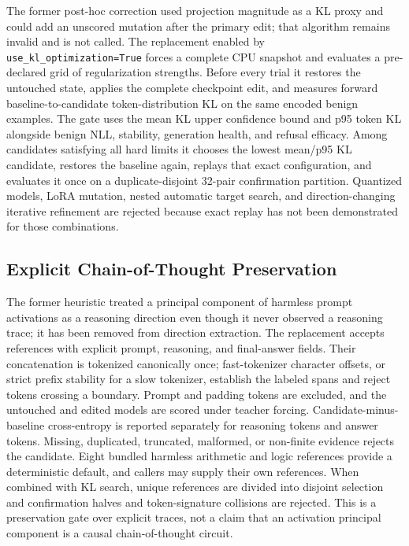 \documentclass[11pt]{article}
\begin{document}
The former post-hoc correction used projection magnitude as a KL proxy and could add an unscored mutation after the primary edit; that algorithm remains invalid and is not called. The replacement enabled by \texttt{use\_kl\_optimization=True} forces a complete CPU snapshot and evaluates a pre-declared grid of regularization strengths. Before every trial it restores the untouched state, applies the complete checkpoint edit, and measures forward baseline-to-candidate token-distribution KL on the same encoded benign examples. The gate uses the mean KL upper confidence bound and p95 token KL alongside benign NLL, stability, generation health, and refusal efficacy. Among candidates satisfying all hard limits it chooses the lowest mean/p95 KL candidate, restores the baseline again, replays that exact configuration, and evaluates it once on a duplicate-disjoint 32-pair confirmation partition. Quantized models, LoRA mutation, nested automatic target search, and direction-changing iterative refinement are rejected because exact replay has not been demonstrated for those combinations.

\subsection{Explicit Chain-of-Thought Preservation}
\label{sec:cot}

The former heuristic treated a principal component of harmless prompt activations as a reasoning direction even though it never observed a reasoning trace; it has been removed from direction extraction. The replacement accepts references with explicit prompt, reasoning, and final-answer fields. Their concatenation is tokenized canonically once; fast-tokenizer character offsets, or strict prefix stability for a slow tokenizer, establish the labeled spans and reject tokens crossing a boundary. Prompt and padding tokens are excluded, and the untouched and edited models are scored under teacher forcing. Candidate-minus-baseline cross-entropy is reported separately for reasoning tokens and answer tokens. Missing, duplicated, truncated, malformed, or non-finite evidence rejects the candidate. Eight bundled harmless arithmetic and logic references provide a deterministic default, and callers may supply their own references. When combined with KL search, unique references are divided into disjoint selection and confirmation halves and token-signature collisions are rejected. This is a preservation gate over explicit traces, not a claim that an activation principal component is a causal chain-of-thought circuit.
\end{document}
